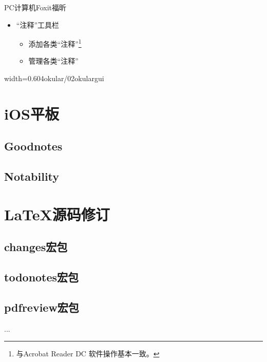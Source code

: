 \documentclass[fontset = none, t, aspectratio=169]{ctexbeamer}
\begin{document}
\begin{frame}{PC计算机}{Foxit福昕}
  \begin{itemize}
  \item \enquote{注释}工具栏
    \begin{itemize}
    \item 添加各类\enquote{注释}\footnote[frame,1]{与Acrobat Reader DC
        软件操作基本一致。}
    \item 管理各类\enquote{注释}
    \end{itemize}
  \end{itemize}
  \begin{center}
    \begin{annotationimage}{width=0.6\textwidth}{04okular/02okulargui}
    \end{annotationimage}
  \end{center}
\end{frame}

\section{iOS平板}
\subsection{Goodnotes}
\subsection{Notability}

\section{\LaTeX 源码修订}
\subsection{changes宏包}
\subsection{todonotes宏包}
\subsection{pdfreview宏包}

\begin{frame}
  ...
\end{frame}
\end{document}
